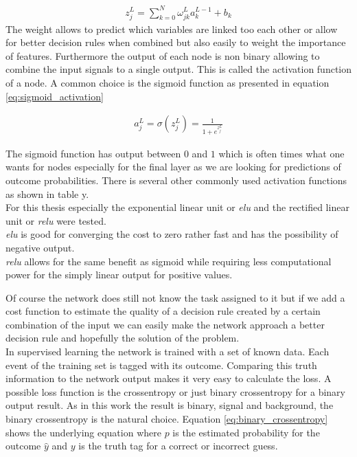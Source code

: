 \begin{align}
    z_j^L = \sum_{k=0}^{N} \omega_{jk}^L a_k^{L-1} + b_k
    \label{eq:node_input}
\end{align}
The weight allows to predict which variables are linked too each other or allow for better decision rules when combined but also easily to weight the importance of features. Furthermore the output of each node is non binary allowing to combine the input signals to a single output. This is called the activation function of a node. A common choice is the sigmoid function as presented in equation \eqref{eq:sigmoid_activation}

\begin{align}
    a_j^L = \sigma ( z_j^L ) = \frac{1}{1 + e^{z_j^L}}
    \label{eq:sigmoid_activation}
\end{align}

The sigmoid function has output between $0$ and $1$ which is often times what one wants for nodes especially for the final layer as we are looking for predictions of outcome probabilities. There is several other commonly used activation functions as shown in table y.\\
For this thesis especially the exponential linear unit or \textit{elu} and the rectified linear unit or \textit{relu} were tested.\\
\textit{elu} is good for converging the cost to zero rather fast and has the possibility of negative output.\\
\textit{relu} allows for the same benefit as sigmoid while requiring less computational power for the simply linear output for positive values.

Of course the network does still not know the task assigned to it but if we add a cost function to estimate the quality of a decision rule created by a certain combination of the input we can easily make the network approach a better decision rule and hopefully the solution of the problem.\\
In supervised learning the network is trained with a set of known data. Each event of the training set is tagged with its outcome. Comparing this truth information to the network output makes it very easy to calculate the loss. A possible loss function is the crossentropy or just binary crossentropy for a binary output result. As in this work the result is binary, signal and background, the binary crossentropy is the natural choice. Equation \eqref{eq:binary_crossentropy} shows the underlying equation where $p$ is the estimated probability for the outcome $\hat{y}$ and $y$ is the truth tag for a  correct or incorrect guess.

